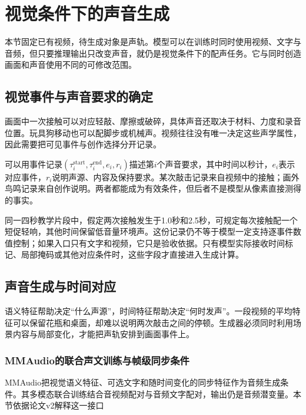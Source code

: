 \section{视觉条件下的声音生成}
\label{sec:vision-multigen-audio}

本节固定已有视频，待生成对象是声轨。模型可以在训练时同时使用视频、文字与音频，但只要推理输出只改变声音，就仍是视觉条件下的配声任务。它与同时创造画面和声音使用不同的可修改范围。

\subsection{视觉事件与声音要求的确定}
\label{sec:vision-multigen-audio-conditions}

画面中一次接触可以对应轻敲、摩擦或破碎，具体声音还取决于材料、力度和录音位置。玩具狗移动也可以配脚步或机械声。视频往往没有唯一决定这些声学属性，因此需要把可见事件与创作选择分开记录。

可以用事件记录$(\tau_i^{\mathrm{start}},\tau_i^{\mathrm{end}},e_i,r_i)$描述第$i$个声音要求，其中时间以秒计，$e_i$表示对应事件，$r_i$说明声源、内容及保持要求。某次敲击记录来自视频中的接触；画外鸟鸣记录来自创作说明。两者都能成为有效条件，但后者不是模型从像素直接测得的事实。

同一四秒教学片段中，假定两次接触发生于1.0秒和2.5秒，可规定每次接触配一个短促轻响，其他时间保留低音量环境声。这份记录仍不等于模型一定支持逐事件数值控制；如果入口只有文字和视频，它只是验收依据。只有模型实际接收时间标记、局部掩码或其他对应条件时，这些字段才直接进入生成计算。

\subsection{声音生成与时间对应}
\label{sec:vision-multigen-audio-alignment}

语义特征帮助决定“什么声源”，时间特征帮助决定“何时发声”。一段视频的平均特征可以保留花瓶和桌面，却难以说明两次敲击之间的停顿。生成器必须同时利用场景内容与局部变化，才能把声轨安排到画面事件上。

\subsubsection{MMAudio的联合声文训练与帧级同步条件}
\label{sec:vision-multigen-mmaudio}

MMAudio把视觉语义特征、可选文字和随时间变化的同步特征作为音频生成条件。其多模态联合训练结合音视频配对与音频文字配对，输出仍是音频潜变量。本节依据论文v2解释这一接口

